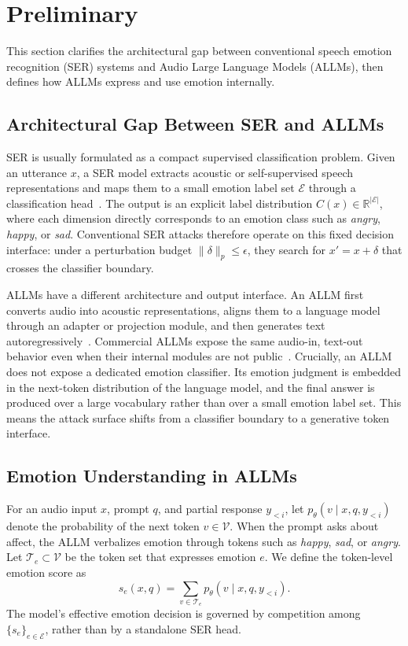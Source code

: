 \section{Preliminary}
\label{sec:background}

This section clarifies the architectural gap between conventional speech emotion recognition (SER) systems and Audio Large Language Models (ALLMs), then defines how ALLMs express and use emotion internally.

\subsection{Architectural Gap Between SER and ALLMs}
\label{sec:bg_ser_allm_gap}

SER is usually formulated as a compact supervised classification problem.
Given an utterance $x$, a SER model extracts acoustic or self-supervised speech representations and maps them to a small emotion label set $\mathcal{E}$ through a classification head~\cite{wav2vec2,hubert,iemocap}.
The output is an explicit label distribution $C(x)\in\mathbb{R}^{|\mathcal{E}|}$, where each dimension directly corresponds to an emotion class such as \textit{angry}, \textit{happy}, or \textit{sad}.
Conventional SER attacks therefore operate on this fixed decision interface: under a perturbation budget $\|\delta\|_p\leq\epsilon$, they search for $x'=x+\delta$ that crosses the classifier boundary.

ALLMs have a different architecture and output interface.
An ALLM first converts audio into acoustic representations, aligns them to a language model through an adapter or projection module, and then generates text autoregressively~\cite{salmonn,qwen2audio}.
Commercial ALLMs expose the same audio-in, text-out behavior even when their internal modules are not public~\cite{gpt4o,gemini}.
Crucially, an ALLM does not expose a dedicated emotion classifier.
Its emotion judgment is embedded in the next-token distribution of the language model, and the final answer is produced over a large vocabulary rather than over a small emotion label set.
This means the attack surface shifts from a classifier boundary to a generative token interface.

\subsection{Emotion Understanding in ALLMs}
\label{sec:bg_allm_emotion}

For an audio input $x$, prompt $q$, and partial response $y_{<i}$, let $p_\theta(v\mid x,q,y_{<i})$ denote the probability of the next token $v\in\mathcal{V}$.
When the prompt asks about affect, the ALLM verbalizes emotion through tokens such as \textit{happy}, \textit{sad}, or \textit{angry}.
Let $\mathcal{T}_e\subset\mathcal{V}$ be the token set that expresses emotion $e$.
We define the token-level emotion score as
\begin{equation}
    s_e(x,q)=\sum_{v\in\mathcal{T}_e} p_\theta(v\mid x,q,y_{<i}).
\end{equation}
The model's effective emotion decision is governed by competition among $\{s_e\}_{e\in\mathcal{E}}$, rather than by a standalone SER head.

